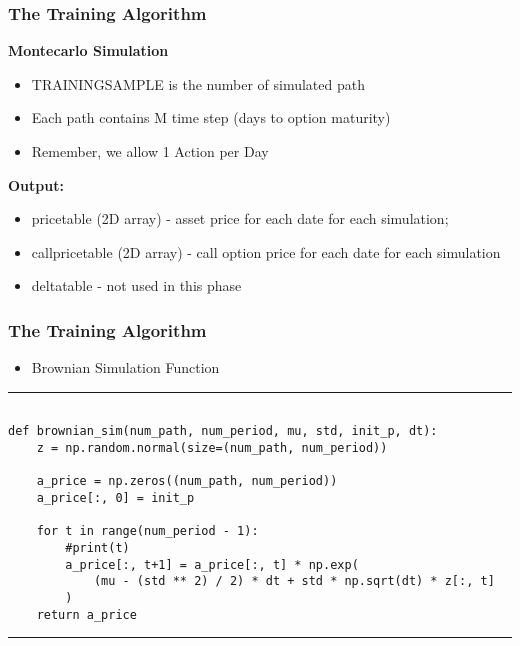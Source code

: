 \documentclass[11pt]{beamer}
\begin{document}
\begin{frame}[fragile]
\frametitle{The Training Algorithm}
	\textbf{Montecarlo Simulation}
	\begin{itemize}
		\item  TRAINING\textunderscore SAMPLE is the number of simulated path
		\item  Each path contains M time step (days to option maturity)
		\item  Remember, we allow 1 Action per Day 
	\end{itemize}
	\textbf{Output:}	
	\begin{itemize}
		\item price\textunderscore table (2D array) - asset price for each date for each simulation;
		\item call\textunderscore price\textunderscore table (2D array) - call option price for each date for each simulation
		\item delta\textunderscore table - not used in this phase 
	\end{itemize}
\end{frame}
\begin{frame}[fragile]
\frametitle{The Training Algorithm}
\scriptsize
	\begin{itemize}
		\item Brownian Simulation Function
	\end{itemize}

\rule{\textwidth}{1pt}
\begin{verbatim}

def brownian_sim(num_path, num_period, mu, std, init_p, dt):
    z = np.random.normal(size=(num_path, num_period))

    a_price = np.zeros((num_path, num_period))
    a_price[:, 0] = init_p

    for t in range(num_period - 1):
        #print(t)
        a_price[:, t+1] = a_price[:, t] * np.exp(
            (mu - (std ** 2) / 2) * dt + std * np.sqrt(dt) * z[:, t]
        )
    return a_price

\end{verbatim}
\rule{\textwidth}{1pt}
\end{frame}
\end{document}

